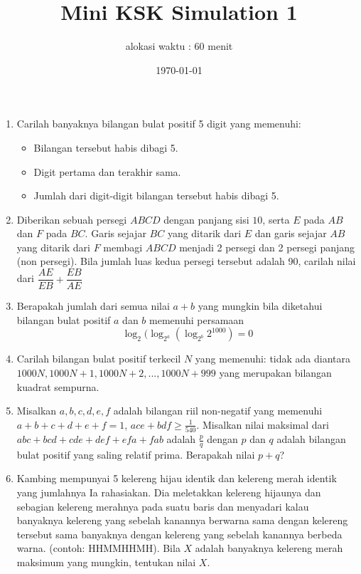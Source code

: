 \documentclass{article}
\title{Mini KSK Simulation 1}
\author{alokasi waktu : 60 menit}
\date{\today}
\begin{document}
	\maketitle
	
	\begin{enumerate}
		\item
		Carilah banyaknya bilangan bulat positif 5 digit yang memenuhi:
		\begin{itemize}
			\item
			Bilangan tersebut habis dibagi 5.
			\item
			Digit pertama dan terakhir sama.
			
			\item
			Jumlah dari digit-digit bilangan tersebut habis dibagi 5.
			
			
		\end{itemize}
	\item
	Diberikan sebuah persegi $ABCD$ dengan panjang sisi $10$, serta $E$ pada $AB$ dan $F$ pada $BC$. Garis sejajar $BC$ yang ditarik dari $E$ dan garis sejajar $AB$ yang ditarik dari $F$ membagi $ABCD$ menjadi 2 persegi dan 2 persegi panjang (non persegi). Bila jumlah luas kedua persegi tersebut adalah 90, carilah nilai dari $\dfrac{AE}{EB} + \dfrac{EB}{AE}$
	
	\item
	Berapakah jumlah dari semua nilai $a+b$ yang mungkin bila diketahui bilangan bulat positif $a$ dan $b$ memenuhi persamaan $$\log_2 (\log_{2^a}(\log_{2^b}2^{1000})=0$$
	
	\item
	Carilah bilangan bulat positif terkecil $N$ yang memenuhi: tidak ada diantara $1000N, 1000N+1, 1000N+2, ... , 1000N+999$ yang merupakan bilangan kuadrat sempurna.
	
	\item
	Misalkan $a,b,c,d,e,f$ adalah bilangan riil non-negatif yang memenuhi $a+b+c+d+e+f=1$, $ace+bdf \ge \frac{1}{540}$. Misalkan nilai maksimal dari $abc+bcd+cde+def+efa+fab$ adalah $\frac{p}{q}$ dengan $p$ dan $q$ adalah bilangan bulat positif yang saling relatif prima. Berapakah nilai $p+q$?
	
	\item
	Kambing mempunyai 5 kelereng hijau identik dan kelereng merah identik yang jumlahnya Ia rahasiakan. Dia meletakkan kelereng hijaunya dan sebagian kelereng merahnya pada suatu baris dan menyadari kalau banyaknya kelereng yang sebelah kanannya berwarna sama dengan kelereng tersebut sama banyaknya dengan kelereng yang sebelah kanannya berbeda warna. (contoh: HHMMHHMH). Bila $X$ adalah banyaknya kelereng merah maksimum yang mungkin, tentukan nilai $X$.
	

\end{enumerate}
\end{document}
